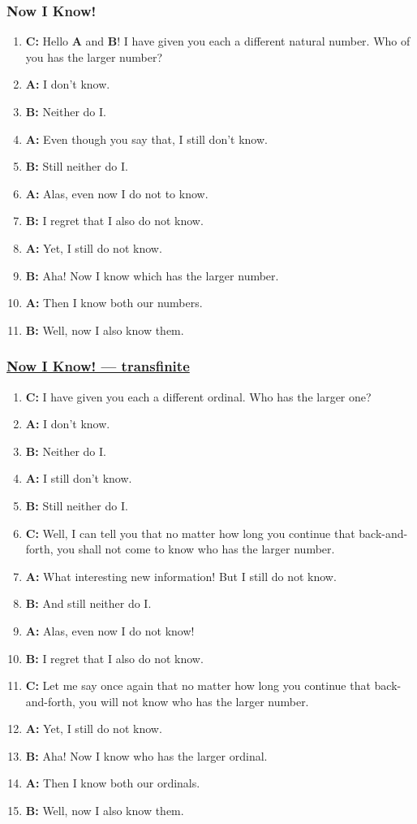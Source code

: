 \documentclass[UTF8,11pt,colorlinks,compress,openany]{beamer}%
\begin{document}
\begin{frame}\frametitle{Now I Know!}
	\begin{enumerate}
		\item \textbf{C:} Hello \textbf{A} and \textbf{B}! I have given you each a different natural number. Who of you has the larger number?
		\item \textbf{A:} I don't know.
		\item \textbf{B:} Neither do I.
		\item \textbf{A:} Even though you say that, I still don't know.
		\item \textbf{B:} Still neither do I.
		\item \textbf{A:} Alas, even now I do not to know.
		\item \textbf{B:} I regret that I also do not know.
		\item \textbf{A:} Yet, I still do not know.
		\item \textbf{B:} Aha! Now I know which has the larger number.
		\item \textbf{A:} Then I know both our numbers.
		\item \textbf{B:} Well, now I also know them.
	\end{enumerate}
\end{frame}

\begin{frame}\frametitle{\href{http://www.matrix67.com/blog/archives/6377?from=timeline}{Now I Know! --- transfinite}}
\vspace*{-6pt}
	\begin{enumerate}
		\item \textbf{C:} I have given you each a different ordinal. Who has the larger one?
		\item \textbf{A:} I don't know.
		\item \textbf{B:} Neither do I.
		\item \textbf{A:} I still don't know.
		\item \textbf{B:} Still neither do I.
		\item \textbf{C:} Well, I can tell you that no matter how long you continue that back-and-forth, you shall not come to know who has the larger number.
		\item \textbf{A:} What interesting new information! But I still do not know.
		\item \textbf{B:} And still neither do I.
		\item \textbf{A:} Alas, even now I do not know!
		\item \textbf{B:} I regret that I also do not know.
		\item \textbf{C:} Let me say once again that no matter how long you continue that back-and-forth, you will not know who has the larger number.
		\item \textbf{A:} Yet, I still do not know.
		\item \textbf{B:} Aha! Now I know who has the larger ordinal.
		\item \textbf{A:} Then I know both our ordinals.
		\item \textbf{B:} Well, now I also know them.
	\end{enumerate}
\end{frame}
\end{document}

